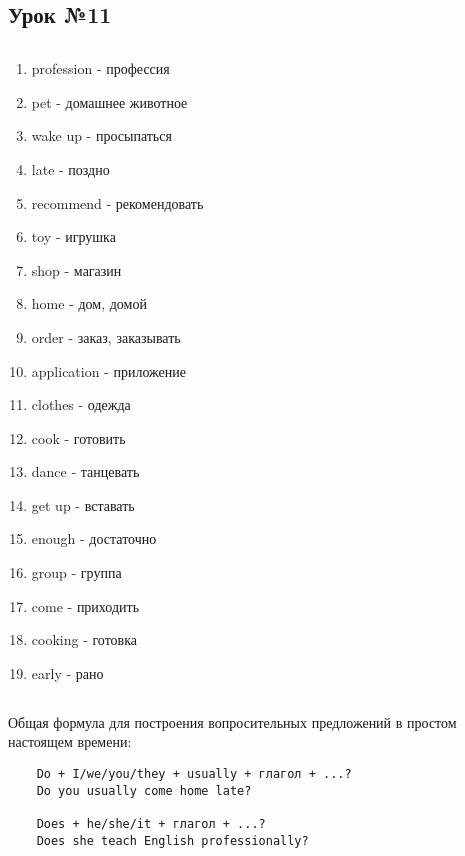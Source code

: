 \subsection{Урок №11}

\subsection*{}
\begin{multicols}{2}
    \begin{enumerate}\setlength{\itemsep}{0pt}
        \item profession - профессия
        \item pet - домашнее животное
        \item wake up - просыпаться
        \item late - поздно
        \item recommend - рекомендовать
        \item toy - игрушка
        \item shop - магазин
        \item home - дом, домой
        \item order - заказ, заказывать
        \item application - приложение
        \item clothes - одежда
        \item cook - готовить
        \item dance - танцевать
        \item get up - вставать
        \item enough - достаточно
        \item group - группа
        \item come - приходить
        \item cooking - готовка
        \item early - рано
    \end{enumerate}
\end{multicols}

\subsection*{}
Общая формула для построения вопросительных предложений в простом настоящем времени:
\begin{verbatim}
    Do + I/we/you/they + usually + глагол + ...?
    Do you usually come home late?

    Does + he/she/it + глагол + ...?
    Does she teach English professionally?
\end{verbatim}